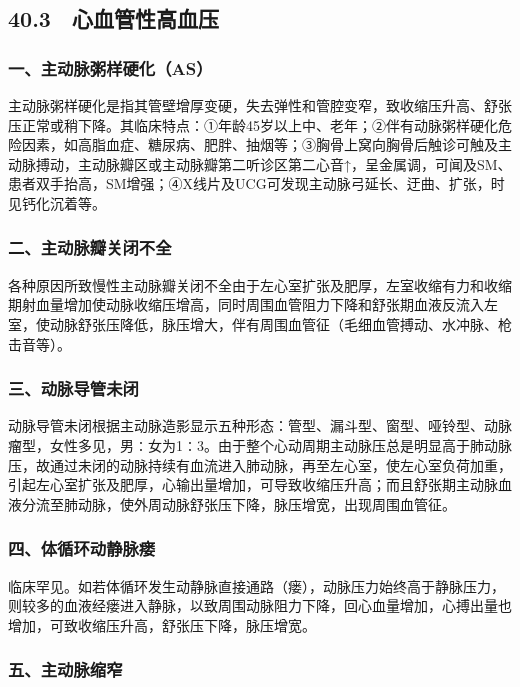 \protect\hypertarget{text00111.html}{}{}

\subsection{40.3　心血管性高血压}

\subsubsection{一、主动脉粥样硬化（AS）}

主动脉粥样硬化是指其管壁增厚变硬，失去弹性和管腔变窄，致收缩压升高、舒张压正常或稍下降。其临床特点：①年龄45岁以上中、老年；②伴有动脉粥样硬化危险因素，如高脂血症、糖尿病、肥胖、抽烟等；③胸骨上窝向胸骨后触诊可触及主动脉搏动，主动脉瓣区或主动脉瓣第二听诊区第二心音↑，呈金属调，可闻及SM、患者双手抬高，SM增强；④X线片及UCG可发现主动脉弓延长、迂曲、扩张，时见钙化沉着等。

\subsubsection{二、主动脉瓣关闭不全}

各种原因所致慢性主动脉瓣关闭不全由于左心室扩张及肥厚，左室收缩有力和收缩期射血量增加使动脉收缩压增高，同时周围血管阻力下降和舒张期血液反流入左室，使动脉舒张压降低，脉压增大，伴有周围血管征（毛细血管搏动、水冲脉、枪击音等）。

\subsubsection{三、动脉导管未闭}

动脉导管未闭根据主动脉造影显示五种形态：管型、漏斗型、窗型、哑铃型、动脉瘤型，女性多见，男∶女为1∶3。由于整个心动周期主动脉压总是明显高于肺动脉压，故通过未闭的动脉持续有血流进入肺动脉，再至左心室，使左心室负荷加重，引起左心室扩张及肥厚，心输出量增加，可导致收缩压升高；而且舒张期主动脉血液分流至肺动脉，使外周动脉舒张压下降，脉压增宽，出现周围血管征。

\subsubsection{四、体循环动静脉瘘}

临床罕见。如若体循环发生动静脉直接通路（瘘），动脉压力始终高于静脉压力，则较多的血液经瘘进入静脉，以致周围动脉阻力下降，回心血量增加，心搏出量也增加，可致收缩压升高，舒张压下降，脉压增宽。

\subsubsection{五、主动脉缩窄}


